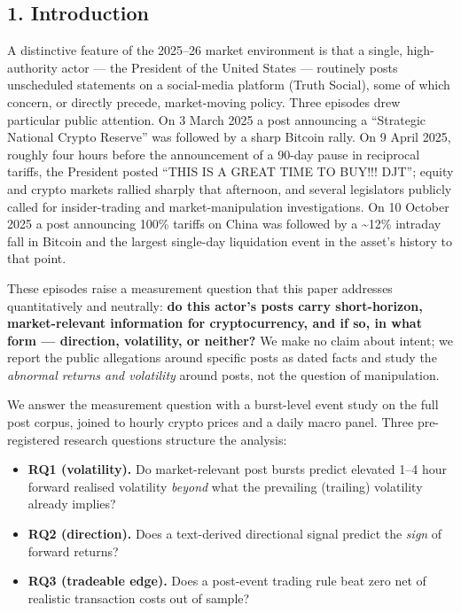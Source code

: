 \documentclass[
]{article}
\providecommand{\tightlist}{%
  \setlength{\itemsep}{0pt}\setlength{\parskip}{0pt}}
\begin{document}
\subsection{1. Introduction}\label{introduction}

A distinctive feature of the 2025--26 market environment is that a
single, high-authority actor --- the President of the United States ---
routinely posts unscheduled statements on a social-media platform (Truth
Social), some of which concern, or directly precede, market-moving
policy. Three episodes drew particular public attention. On 3 March 2025
a post announcing a ``Strategic National Crypto Reserve'' was followed
by a sharp Bitcoin rally. On 9 April 2025, roughly four hours before the
announcement of a 90-day pause in reciprocal tariffs, the President
posted ``THIS IS A GREAT TIME TO BUY!!! DJT''; equity and crypto markets
rallied sharply that afternoon, and several legislators publicly called
for insider-trading and market-manipulation investigations. On 10
October 2025 a post announcing 100\% tariffs on China was followed by a
\textasciitilde12\% intraday fall in Bitcoin and the largest single-day
liquidation event in the asset's history to that point.

These episodes raise a measurement question that this paper addresses
quantitatively and neutrally: \textbf{do this actor's posts carry
short-horizon, market-relevant information for cryptocurrency, and if
so, in what form --- direction, volatility, or neither?} We make no
claim about intent; we report the public allegations around specific
posts as dated facts and study the \emph{abnormal returns and
volatility} around posts, not the question of manipulation.

We answer the measurement question with a burst-level event study on the
full post corpus, joined to hourly crypto prices and a daily macro
panel. Three pre-registered research questions structure the analysis:

\begin{itemize}
\tightlist
\item
  \textbf{RQ1 (volatility).} Do market-relevant post bursts predict
  elevated 1--4 hour forward realised volatility \emph{beyond} what the
  prevailing (trailing) volatility already implies?
\item
  \textbf{RQ2 (direction).} Does a text-derived directional signal
  predict the \emph{sign} of forward returns?
\item
  \textbf{RQ3 (tradeable edge).} Does a post-event trading rule beat
  zero net of realistic transaction costs out of sample?
\end{itemize}
\end{document}
